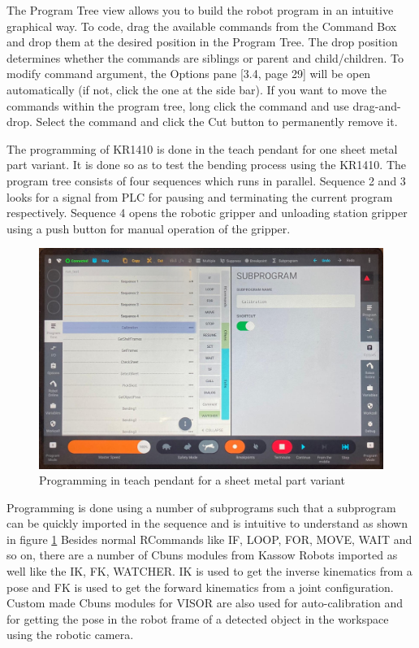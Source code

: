 The Program Tree view allows you to build the robot program in an intuitive graphical way. To code, drag
the available commands from the Command Box and drop them at the desired position in the Program
Tree. The drop position determines whether the commands are siblings or parent and child/children. To
modify command argument, the Options pane [3.4, page 29] will be open automatically (if not, click the
one at the side bar). If you want to move the commands within the program tree, long click the command
and use drag-and-drop. Select the command and click the Cut button to permanently remove it.

The programming of KR1410 is done in the teach pendant for one sheet metal part variant.
It is done so as to test the bending process using the KR1410.
The program tree consists of four sequences which runs in parallel.
Sequence 2 and 3 looks for a signal from PLC for pausing and terminating the current program
respectively. Sequence 4 opens the robotic gripper and unloading station gripper using a push button
for manual operation of the gripper.

\begin{figure}[h]
    \centering
    \includegraphics[width=\textwidth]{figures/programtree.png}
    \caption{Programming in teach pendant for a sheet metal part variant}
    \label{fig:programtree}
\end{figure}

Programming is done using a number of subprograms such that a subprogram
can be quickly imported in the sequence and is intuitive to understand as shown in figure \ref{fig:programtree}
Besides normal RCommands like IF, LOOP, FOR, MOVE, WAIT and so on, there are a number of Cbuns modules
from Kassow Robots
imported as well like the IK, FK, WATCHER. IK is used to get the inverse
kinematics from a pose and FK is used to get the forward kinematics
from a joint configuration.
Custom made Cbuns modules for VISOR
are also used for auto-calibration and for getting the pose in the
robot frame of a detected object in the workspace using the robotic camera.

